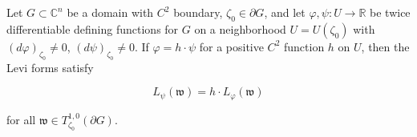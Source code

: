 Let $G \subset \mathbb{C}^n$ be a domain with $C^2$ boundary, $\zeta_0 \in \partial G$, and let $\varphi, \psi: U \to \mathbb{R}$ be twice differentiable defining functions for $G$ on a neighborhood $U = U(\zeta_0)$ with $(d\varphi)_{\zeta_0} \neq 0$, $(d\psi)_{\zeta_0} \neq 0$. If $\varphi = h \cdot \psi$ for a positive $C^2$ function $h$ on $U$, then the Levi forms satisfy

$$L_{\psi}(\mathfrak{w}) = h \cdot L_{\varphi}(\mathfrak{w})$$

for all $\mathfrak{w} \in T_{\zeta_0}^{1,0}(\partial G)$.
